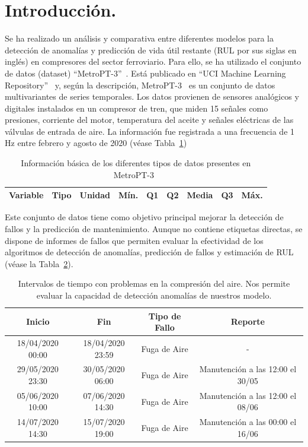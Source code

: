 \documentclass[12pt,letterpaper]{article}
\begin{document}
\hypertarget{Indice}{}
\tableofcontents
\newpage
\section{Introducción.}
Se ha realizado un análisis y comparativa entre diferentes modelos para la detección de anomalías y predicción de vida útil restante (RUL por sus siglas en inglés)
en compresores del sector ferroviario. Para ello, se ha utilizado el conjunto de datos (dataset) ``MetroPT-3''~\cite{MetroPT-3}.
Está publicado en ``UCI Machine Learning Repository''~\cite{UCIMLR} y, según la descripción, MetroPT-3~\cite{MetroPT-3} es un conjunto de datos multivariantes de series temporales. Los datos provienen de sensores analógicos y digitales 
instalados en un compresor de tren, que miden 15 señales como presiones, corriente del motor, temperatura del aceite y señales eléctricas de las válvulas de entrada de aire. 
La información fue registrada a una frecuencia de 1 Hz entre febrero y agosto de 2020 (véase Tabla~\ref{tab:DatosBasicos})

\begin{table}[!ht]
    \centering
    \begin{tabular}{|l|l|l|c|c|c|c|c|c|}
    \hline
        \textbf{Variable} & \textbf{Tipo} & \textbf{Unidad} & \textbf{Mín.} & \textbf{Q1} & \textbf{Q2} & \textbf{Media} & \textbf{Q3} & \textbf{Máx.} \\ \hline
        \hline
    \end{tabular}
    \caption{Información básica de los diferentes tipos de datos presentes en MetroPT-3~\cite{MetroPT-3}}
    \label{tab:DatosBasicos}
\end{table}

Este conjunto de datos tiene como objetivo principal mejorar la detección de fallos y la predicción de mantenimiento. 
Aunque no contiene etiquetas directas, se dispone de informes de fallos que permiten evaluar la efectividad de los algoritmos de detección de anomalías, predicción de fallos y estimación de RUL (véase la Tabla~\ref{tab:Reportes}).

\begin{table}[!ht]
    \centering
    \begin{tabular}{|c|c|c|c|}
    \hline
    \textbf{Inicio} & \textbf{Fin} & \textbf{Tipo de Fallo} & \textbf{Reporte} \\ 
    \hline
    18/04/2020 00:00 & 18/04/2020 23:59 & Fuga de Aire & - \\ 
    29/05/2020 23:30 & 30/05/2020 06:00 & Fuga de Aire & Manutención a las 12:00 el 30/05\\
    05/06/2020 10:00 & 07/06/2020 14:30 & Fuga de Aire & Manutención a las 12:00 el 08/06\\
    14/07/2020 14:30 & 15/07/2020 19:00 & Fuga de Aire & Manutención a las 00:00 el 16/06\\
    \hline
    \end{tabular}
    \caption{
    Intervalos de tiempo con problemas en la compresión del aire.
    Nos permite evaluar la capacidad de detección anomalías de nuestros modelo.}
    \label{tab:Reportes}
\end{table}
\end{document}
